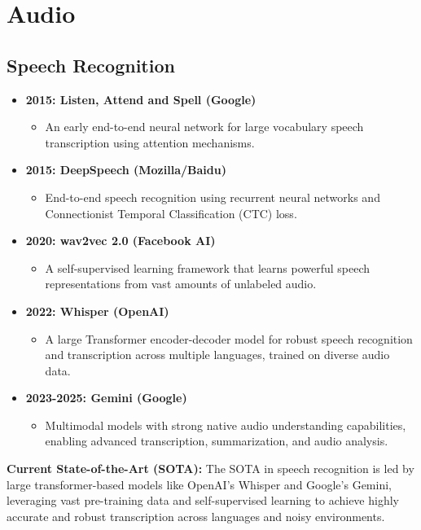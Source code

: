 \documentclass{article}
\begin{document}
\section{Audio}

\subsection{Speech Recognition}
\begin{itemize}[leftmargin=1.5em]
\item \textbf{2015: Listen, Attend and Spell (Google)}
  \begin{itemize}
    \item An early end-to-end neural network for large vocabulary speech transcription using attention mechanisms.
  \end{itemize}
\item \textbf{2015: DeepSpeech (Mozilla/Baidu)}
  \begin{itemize}
    \item End-to-end speech recognition using recurrent neural networks and Connectionist Temporal Classification (CTC) loss.
  \end{itemize}
\item \textbf{2020: wav2vec 2.0 (Facebook AI)}
  \begin{itemize}
    \item A self-supervised learning framework that learns powerful speech representations from vast amounts of unlabeled audio.
  \end{itemize}
\item \textbf{2022: Whisper (OpenAI)}
  \begin{itemize}
    \item A large Transformer encoder-decoder model for robust speech recognition and transcription across multiple languages, trained on diverse audio data.
  \end{itemize}
\item \textbf{2023-2025: Gemini (Google)}
  \begin{itemize}
    \item Multimodal models with strong native audio understanding capabilities, enabling advanced transcription, summarization, and audio analysis.
  \end{itemize}
\end{itemize}
\textbf{Current State-of-the-Art (SOTA):} The SOTA in speech recognition is led by large transformer-based models like OpenAI's Whisper and Google's Gemini, leveraging vast pre-training data and self-supervised learning to achieve highly accurate and robust transcription across languages and noisy environments.
\end{document}
